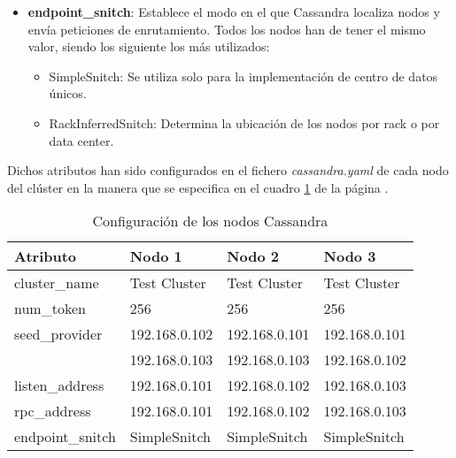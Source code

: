\begin{itemize}
\item \textbf{endpoint\_snitch}: Establece el modo en el que Cassandra localiza nodos y envía peticiones de enrutamiento. Todos los nodos han de tener el mismo valor, siendo los siguiente los más utilizados:

\begin{itemize}
	\item SimpleSnitch: Se utiliza solo para la implementación de centro de datos únicos.
	\item RackInferredSnitch: Determina la ubicación de los nodos por rack o por data center.
\end{itemize}
	 
\end{itemize}
	 
Dichos atributos han sido configurados en el fichero \textit{cassandra.yaml} de cada nodo del clúster en la manera que se especifica en el cuadro \ref{configuracion-nodos-cassandra} de la página \pageref{configuracion-nodos-cassandra}. 

\begin{table}[h!]
	\centering
	\begin{tabular}{|l||l|l|l|}
		
		\hline
		
		\textbf{Atributo} & \textbf{Nodo} 1 & \textbf{Nodo 2} & \textbf{Nodo 3} \\
		
		\hline
		\hline
		
		cluster\_name & Test Cluster & Test Cluster & Test Cluster \\
		
		\hline
		
		num\_token & 256 & 256 & 256 \\
		
		\hline
		
		seed\_provider & 192.168.0.102 & 192.168.0.101 & 192.168.0.101 \\ 
		               & 192.168.0.103 & 192.168.0.103 & 192.168.0.102 \\ 
		
		\hline
		
		listen\_address & 192.168.0.101 & 192.168.0.102 & 192.168.0.103 \\
		
		\hline
		
		rpc\_address & 192.168.0.101 & 192.168.0.102 & 192.168.0.103 \\
		
		\hline
		
		endpoint\_snitch & SimpleSnitch & SimpleSnitch & SimpleSnitch \\
		
		\hline
		
	\end{tabular}
	\caption{Configuración de los nodos Cassandra}
	\label{configuracion-nodos-cassandra}
\end{table}

